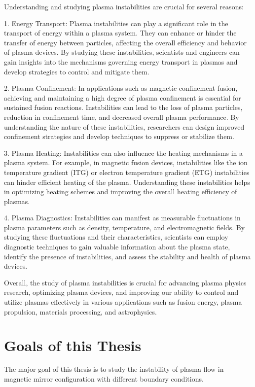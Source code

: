 Understanding and studying plasma instabilities are crucial for several reasons:

1. Energy Transport: Plasma instabilities can play a significant role in the transport of energy within a plasma system. They can enhance or hinder the transfer of energy between particles, affecting the overall efficiency and behavior of plasma devices. By studying these instabilities, scientists and engineers can gain insights into the mechanisms governing energy transport in plasmas and develop strategies to control and mitigate them.

2. Plasma Confinement: In applications such as magnetic confinement fusion, achieving and maintaining a high degree of plasma confinement is essential for sustained fusion reactions. Instabilities can lead to the loss of plasma particles, reduction in confinement time, and decreased overall plasma performance. By understanding the nature of these instabilities, researchers can design improved confinement strategies and develop techniques to suppress or stabilize them.

3. Plasma Heating: Instabilities can also influence the heating mechanisms in a plasma system. For example, in magnetic fusion devices, instabilities like the ion temperature gradient (ITG) or electron temperature gradient (ETG) instabilities can hinder efficient heating of the plasma. Understanding these instabilities helps in optimizing heating schemes and improving the overall heating efficiency of plasmas.

4. Plasma Diagnostics: Instabilities can manifest as measurable fluctuations in plasma parameters such as density, temperature, and electromagnetic fields. By studying these fluctuations and their characteristics, scientists can employ diagnostic techniques to gain valuable information about the plasma state, identify the presence of instabilities, and assess the stability and health of plasma devices.

Overall, the study of plasma instabilities is crucial for advancing plasma physics research, optimizing plasma devices, and improving our ability to control and utilize plasmas effectively in various applications such as fusion energy, plasma propulsion, materials processing, and astrophysics.

\section{Goals of this Thesis}
The major goal of this thesis is to study the instability of plasma flow in magnetic mirror configuration with different boundary conditions.

